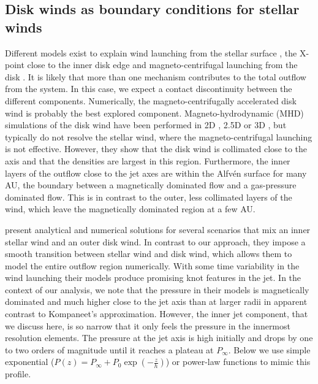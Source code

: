 \subsection{Disk winds as boundary conditions for stellar winds}
Different models exist to explain wind launching from the stellar surface \citep{1988ApJ...332L..41K,2005ApJ...632L.135M}, the X-point close to the inner disk edge \citep{1994ApJ...429..781S} and magneto-centrifugal launching from the disk \citep{1982MNRAS.199..883B,2005ApJ...630..945A}. It is likely that more than one mechanism contributes to the total outflow from the system. In this case, we expect a contact discontinuity between the different components. Numerically, the magneto-centrifugally accelerated disk wind is probably the best explored component. Magneto-hydrodynamic (MHD) simulations of the disk wind have been performed in 2D \citep[e.g.][]{2005ApJ...630..945A}, 2.5D \citep[e.g.][]{2011ApJ...728L..11R} or 3D \citep[e.g.][]{2006ApJ...653L..33A}, but typically do not resolve the stellar wind, where the magneto-centrifugal launching is not effective. However, they show that the disk wind is collimated close to the axis and that the densities are largest in this region. Furthermore, the inner layers of the outflow close to the jet axes are within the Alfv\'en surface for many AU, the boundary between a magnetically dominated flow and a gas-pressure dominated flow. This is in contrast to the outer, less collimated layers of the wind, which leave the magnetically dominated region at a few AU.

\citet{2009A&A...502..217M} present analytical and numerical solutions for several scenarios that mix an inner stellar wind and an outer disk wind. In contrast to our approach, they impose a smooth transition between stellar wind and disk wind, which allows them to model the entire outflow region numerically. With some time variability in the wind launching their models produce promising knot features in the jet. In the context of our analysis, we note that the pressure in their models is magnetically dominated and much higher close to the jet axis than at larger radii in apparent contrast to Kompaneet's approximation. However, the inner jet component, that we discuss here, is so narrow that it only feels the pressure in the innermost resolution elements. The pressure at the jet axis is high initially and drops by one to two orders of magnitude until it reaches a plateau at $P_\infty$. Below we use simple exponential ($P(z)=P_\infty+P_0\exp\left(-\frac{z}{h}\right)$) or power-law functions to mimic this profile.

